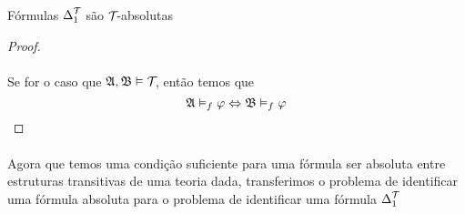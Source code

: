 \begin{theorem}{Fórmulas $\Delta^{\mathcal{T}_{}}_{1}$ são $\mathcal{T}_{}$-absolutas}
\begin{proof}
                    \paragraph{}
                        Se for o caso que $\mathfrak{A},\mathfrak{B}\vDash\mathcal{T}_{}$, então temos que
                        $$\mathfrak{A}\vDash_f\varphi\Leftrightarrow\mathfrak{B}\vDash_f\varphi$$\eop
                \end{proof}
            \end{theorem}
            \paragraph{}
                Agora que temos uma condição suficiente para uma fórmula ser absoluta entre estruturas 
                transitivas de uma teoria dada, transferimos o problema de identificar uma fórmula 
                absoluta para o problema de identificar uma fórmula $\Delta^{\mathcal{T}_{}}_{1}$
